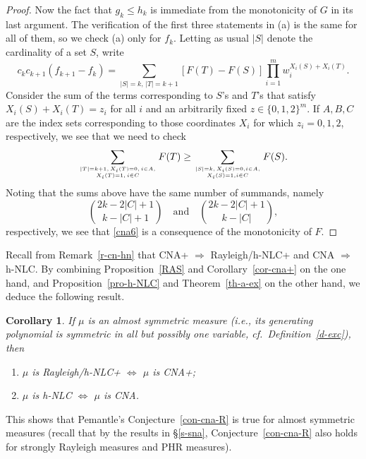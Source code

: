 \documentclass[10pt,reqno]{amsart}
\theoremstyle{plain}
\newtheorem{corollary}[theorem]{Corollary}
\theoremstyle{definition}
\theoremstyle{remark}
\begin{document}
\begin{proof}
Now the fact that $g_k\leq h_k$ is immediate from the monotonicity of $G$  
in its last argument. The
verification of the first three statements in (a) is the  same 
for all of them, so
we check (a) only for $f_k$. Letting as usual $|S|$ denote the cardinality
of a set $S$, write
$$c_kc_{k+1}(f_{k+1}-f_k)= 
\sum_{|S|=k,\,|T|=k+1} [F(T)-F(S)] \prod_{i=1}^mw_i^{X_i(S)+X_i(T)}.$$
Consider the sum of the terms corresponding to $S$'s and $T$'s that  
satisfy $X_i(S)+X_i(T)=z_i$
for all $i$ and an arbitrarily fixed $z\in\{0,1,2\}^m$. If $A,B,C$ are the  
index sets corresponding to those coordinates $X_i$ for which
$z_i=0,1,2$, respectively, we see that we need to check
\begin{equation}\label{cna6}
\sum_{|T|=k+1,\,X_i(T)=0,\,i\in A,\atop X_i(T)=1,\,i\in C} F(T)\geq
\sum_{|S|=k,\,X_i(S)=0,i\in A,\atop X_i(S)=1,i\in C} F(S).
\end{equation}
Noting that the sums above have the same number of summands, namely
$$\binom{2k-2|C|+1}{k-|C|+1}\quad\text{and}\quad\binom{2k-2|C|+1}{k-| C|},$$
respectively, we see that \eqref{cna6} is a consequence of the monotonicity  
of $F$.
\end{proof}

Recall from Remark~\ref{r-cn-hn} that CNA+ $\Rightarrow$ Rayleigh/h-NLC+ and 
CNA $\Rightarrow$ h-NLC. By combining Proposition~\ref{RAS} and 
Corollary~\ref{cor-cna+} on the one hand, and Proposition~\ref{pro-h-NLC} and 
Theorem~\ref{th-a-ex} on the other hand, we deduce the following result.

\begin{corollary}\label{RandC}
If $\mu$ is an almost symmetric measure (i.e., its
generating polynomial is symmetric in all but possibly one variable,
cf.~Definition~\ref{d-exc}), then 
\begin{enumerate}
\item $\mu$ is Rayleigh/h-NLC+ $\Longleftrightarrow$ $\mu$ is CNA+;
\item $\mu$ is h-NLC $\Longleftrightarrow$ $\mu$ is CNA.
\end{enumerate}
\end{corollary} 

This shows that Pemantle's Conjecture~\ref{con-cna-R} 
is true for almost 
symmetric measures (recall that by the results in \S \ref{s-sna}, 
Conjecture~\ref{con-cna-R} also holds for strongly Rayleigh measures and
PHR measures).
\end{document}
